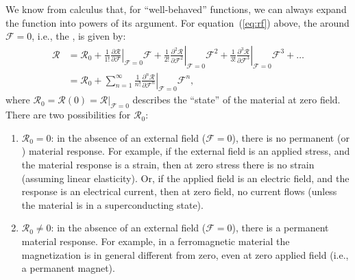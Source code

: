 We know from calculus that, for ``well-behaved'' functions, we can always expand the function into powers of its argument. For equation~(\ref{eq:rf}) above, the  around $\mathcal{F}=0$, i.e., the , is given by:
\begin{align}
	\mathcal{R}&=\mathcal{R}_0 + 
	\frac{1}{1!}\left.\frac{\partial\mathcal{R}}{\partial\mathcal{F}}\right 
	\vert_{\mathcal{F}=0}\!\!\!\!\mathcal{F} + 
	\frac{1}{2!}\left.\frac{\partial^2\mathcal{R}}{\partial\mathcal{F}^2}\right 
	\vert_{\mathcal{F}=0}\!\!\!\!\mathcal{F}^2 + 
	\frac{1}{3!}\left.\frac{\partial^3\mathcal{R}}{\partial\mathcal{F}^3}\right 
	\vert_{\mathcal{F}=0}\!\!\!\!\mathcal{F}^3 + \ldots \nonumber\\
	&= \mathcal{R}_0 +
	\sum_{n=1}^{\infty}\frac{1}{n!}\left.\frac{\partial^n\mathcal{R}}{\partial\mathcal{F}^n}\right 
	\vert_{\mathcal{F}=0}\!\!\!\!\mathcal{F}^n,
	\label{eq:expansion}
\end{align}
where $\mathcal{R}_0 = \mathcal{R}(0)=\mathcal{R}\vert_{\mathcal{F}=0}$ describes the ``state'' of the material at zero field.  There are two possibilities for $\mathcal{R}_0$:
\begin{enumerate}
	\item $\mathcal{R}_0=0$: in the absence of an external field ($\mathcal{F}=0$), there is no permanent (or ) material response.  For example, if the external field is an applied stress, and the material response is a strain, then at zero stress there is no strain (assuming linear elasticity).  Or, if the applied field is an electric field, and the response is an electrical current, then at zero field, no current flows (unless the material is in a superconducting state).
	
	\item $\mathcal{R}_0\neq 0$: in the absence of an external field ($\mathcal{F}=0$), there is a permanent material response.  For example, in a ferromagnetic material the magnetization is in general different from zero, even at zero applied field (i.e., a permanent magnet).  
\end{enumerate}

